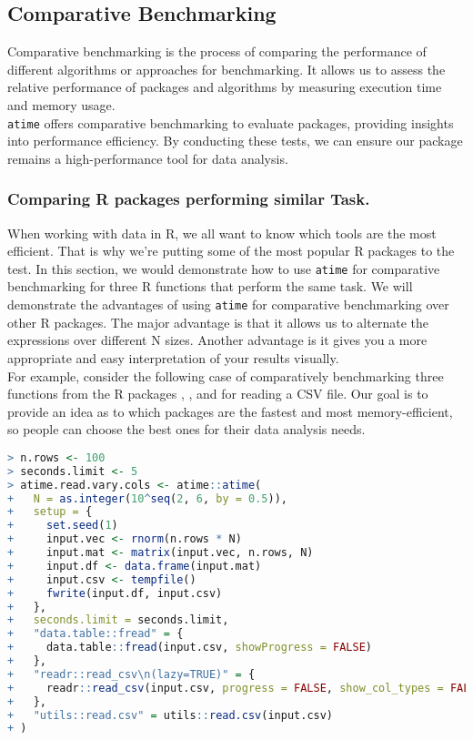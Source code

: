 \subsection{Comparative Benchmarking}

\noindent Comparative benchmarking is the process of comparing the performance of different algorithms or approaches for benchmarking. It allows us to assess the relative performance of packages and algorithms by measuring execution time and memory usage.\\

\noindent \texttt{atime} offers comparative benchmarking to evaluate packages, providing insights into performance efficiency. By conducting these tests, we can ensure our package remains a high-performance tool for data analysis.\\

\subsubsection{Comparing R packages performing similar Task.}
\noindent When working with data in R, we all want to know which tools are the most efficient. That is why we're putting some of the most popular R packages to the test. 
In this section, we would demonstrate how to use \texttt{atime} for comparative benchmarking for three R functions that perform the same task. We will demonstrate the advantages of using \texttt{atime} for comparative benchmarking over other R packages. The major advantage is that it allows us to alternate the expressions over different N sizes. Another advantage is it gives you a more appropriate and easy interpretation of your results visually.\\

\noindent For example, consider the following case of comparatively benchmarking three functions from the R packages , , and  for reading a CSV file. Our goal is to provide an idea as to which packages are the fastest and most memory-efficient, so people can choose the best ones for their data analysis needs.\\

\begin{lstlisting}[language=R]
> n.rows <- 100
> seconds.limit <- 5
> atime.read.vary.cols <- atime::atime(
+   N = as.integer(10^seq(2, 6, by = 0.5)),
+   setup = {
+     set.seed(1)
+     input.vec <- rnorm(n.rows * N)
+     input.mat <- matrix(input.vec, n.rows, N)
+     input.df <- data.frame(input.mat)
+     input.csv <- tempfile()
+     fwrite(input.df, input.csv)
+   },
+   seconds.limit = seconds.limit,
+   "data.table::fread" = {
+     data.table::fread(input.csv, showProgress = FALSE)
+   },
+   "readr::read_csv\n(lazy=TRUE)" = {
+     readr::read_csv(input.csv, progress = FALSE, show_col_types = FALSE, lazy = TRUE)
+   },
+   "utils::read.csv" = utils::read.csv(input.csv)
+ )
\end{lstlisting}

